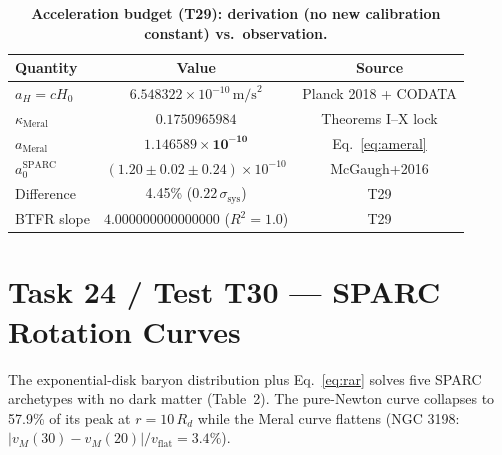 \documentclass[12pt,a4paper]{article}
\begin{document}
\begin{table}[!htbp]
\centering\footnotesize
\setlength{\tabcolsep}{3pt}
\caption{\textbf{Acceleration budget (T29): derivation (no new calibration constant) vs.\ observation.}}
\label{tab:acc}
\vspace{0.1cm}
\begin{tabular}{@{}l|c|c@{}}
\toprule
Quantity & Value & Source \\
\midrule
$a_H = cH_0$ & $6.548322\times 10^{-10}\,\mathrm{m/s}^2$ & Planck 2018 + CODATA \\
$\kappa_{\mathrm{Meral}}$ & $0.1750965984$ & Theorems I--X lock \\
$a_{\mathrm{Meral}}$ & $\mathbf{1.146589\times 10^{-10}}$ & Eq.~\ref{eq:ameral} \\
$a_0^{\mathrm{SPARC}}$ & $(1.20\pm 0.02\pm 0.24)\times 10^{-10}$ & McGaugh+2016 \\
Difference & 4.45\% ($0.22\,\sigma_{\mathrm{sys}}$) & T29 \\
BTFR slope & $4.000000000000000$ ($R^2=1.0$) & T29 \\
\bottomrule
\end{tabular}
\end{table}

\section{Task 24 / Test T30 --- SPARC Rotation Curves}

The exponential-disk baryon distribution plus Eq.~\ref{eq:rar} solves five SPARC
archetypes with no dark matter (Table~2). The pure-Newton curve collapses to
57.9\% of its peak at $r = 10\,R_d$ while the Meral curve flattens
(NGC 3198: $|v_M(30)-v_M(20)|/v_{\mathrm{flat}} = 3.4\%$).
\end{document}
